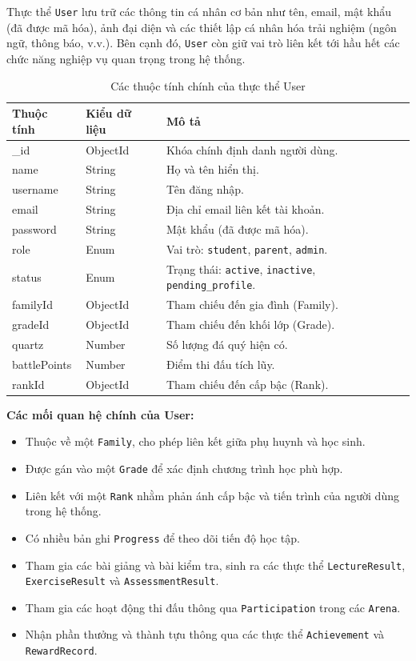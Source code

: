 \newline
\vspace{0.2cm}
Thực thể \texttt{User} lưu trữ các thông tin cá nhân cơ bản như tên, email, mật khẩu (đã được mã hóa), ảnh đại diện và các thiết lập cá nhân hóa trải nghiệm (ngôn ngữ, thông báo, v.v.). 
Bên cạnh đó, \texttt{User} còn giữ vai trò liên kết tới hầu hết các chức năng nghiệp vụ quan trọng trong hệ thống.

\begin{table}[H]
	\centering
	\begin{tabularx}{\textwidth}{|l|l|X|}
		\hline
		\textbf{Thuộc tính} & \textbf{Kiểu dữ liệu} & \textbf{Mô tả} \\ \hline
		\_id & ObjectId & Khóa chính định danh người dùng. \\ \hline
		name & String & Họ và tên hiển thị. \\ \hline
		username & String & Tên đăng nhập. \\ \hline
		email & String & Địa chỉ email liên kết tài khoản. \\ \hline
		password & String & Mật khẩu (đã được mã hóa). \\ \hline
		role & Enum & Vai trò: \texttt{student}, \texttt{parent}, \texttt{admin}. \\ \hline
		status & Enum & Trạng thái: \texttt{active}, \texttt{inactive}, \texttt{pending\_profile}. \\ \hline
		familyId & ObjectId & Tham chiếu đến gia đình (Family). \\ \hline
		gradeId & ObjectId & Tham chiếu đến khối lớp (Grade). \\ \hline
		quartz & Number & Số lượng đá quý hiện có. \\ \hline
		battlePoints & Number & Điểm thi đấu tích lũy. \\ \hline
		rankId & ObjectId & Tham chiếu đến cấp bậc (Rank). \\ \hline
	\end{tabularx}
	\caption{Các thuộc tính chính của thực thể User}
\end{table}
\newline
\textbf{Các mối quan hệ chính của User:}
\begin{itemize}
	\item Thuộc về một \texttt{Family}, cho phép liên kết giữa phụ huynh và học sinh.
	\item Được gán vào một \texttt{Grade} để xác định chương trình học phù hợp.
	\item Liên kết với một \texttt{Rank} nhằm phản ánh cấp bậc và tiến trình của người dùng trong hệ thống.
	\item Có nhiều bản ghi \texttt{Progress} để theo dõi tiến độ học tập.
	\item Tham gia các bài giảng và bài kiểm tra, sinh ra các thực thể \texttt{LectureResult}, \texttt{ExerciseResult} và \texttt{AssessmentResult}.
	\item Tham gia các hoạt động thi đấu thông qua \texttt{Participation} trong các \texttt{Arena}.
	\item Nhận phần thưởng và thành tựu thông qua các thực thể \texttt{Achievement} và \texttt{RewardRecord}.
\end{itemize}


